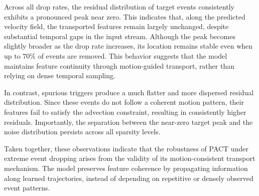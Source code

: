 \documentclass[runningheads]{llncs}
\begin{document}
Across all drop rates, the residual distribution of target events consistently exhibits a pronounced peak near zero.
This indicates that, along the predicted velocity field, the transported features remain largely unchanged, despite substantial temporal gaps in the input stream.
Although the peak becomes slightly broader as the drop rate increases, its location remains stable even when up to $70\%$ of events are removed.
This behavior suggests that the model maintains feature continuity through motion-guided transport, rather than relying on dense temporal sampling.

In contrast, spurious triggers produce a much flatter and more dispersed residual distribution.
Since these events do not follow a coherent motion pattern, their features fail to satisfy the advection constraint, resulting in consistently higher residuals.
Importantly, the separation between the near-zero target peak and the noise distribution persists across all sparsity levels.

Taken together, these observations indicate that the robustness of PACT under extreme event dropping arises from the validity of its motion-consistent transport mechanism.
The model preserves feature coherence by propagating information along learned trajectories, instead of depending on repetitive or densely observed event patterns.




\end{document}
